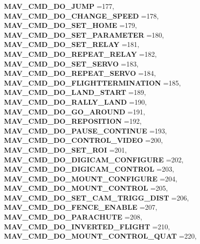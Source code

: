 \begin{DoxyCompactItemize}
\textbf{ M\+A\+V\+\_\+\+C\+M\+D\+\_\+\+D\+O\+\_\+\+J\+U\+MP} =177, 
\textbf{ M\+A\+V\+\_\+\+C\+M\+D\+\_\+\+D\+O\+\_\+\+C\+H\+A\+N\+G\+E\+\_\+\+S\+P\+E\+ED} =178, 
\newline
\textbf{ M\+A\+V\+\_\+\+C\+M\+D\+\_\+\+D\+O\+\_\+\+S\+E\+T\+\_\+\+H\+O\+ME} =179, 
\textbf{ M\+A\+V\+\_\+\+C\+M\+D\+\_\+\+D\+O\+\_\+\+S\+E\+T\+\_\+\+P\+A\+R\+A\+M\+E\+T\+ER} =180, 
\textbf{ M\+A\+V\+\_\+\+C\+M\+D\+\_\+\+D\+O\+\_\+\+S\+E\+T\+\_\+\+R\+E\+L\+AY} =181, 
\textbf{ M\+A\+V\+\_\+\+C\+M\+D\+\_\+\+D\+O\+\_\+\+R\+E\+P\+E\+A\+T\+\_\+\+R\+E\+L\+AY} =182, 
\newline
\textbf{ M\+A\+V\+\_\+\+C\+M\+D\+\_\+\+D\+O\+\_\+\+S\+E\+T\+\_\+\+S\+E\+R\+VO} =183, 
\textbf{ M\+A\+V\+\_\+\+C\+M\+D\+\_\+\+D\+O\+\_\+\+R\+E\+P\+E\+A\+T\+\_\+\+S\+E\+R\+VO} =184, 
\textbf{ M\+A\+V\+\_\+\+C\+M\+D\+\_\+\+D\+O\+\_\+\+F\+L\+I\+G\+H\+T\+T\+E\+R\+M\+I\+N\+A\+T\+I\+ON} =185, 
\textbf{ M\+A\+V\+\_\+\+C\+M\+D\+\_\+\+D\+O\+\_\+\+L\+A\+N\+D\+\_\+\+S\+T\+A\+RT} =189, 
\newline
\textbf{ M\+A\+V\+\_\+\+C\+M\+D\+\_\+\+D\+O\+\_\+\+R\+A\+L\+L\+Y\+\_\+\+L\+A\+ND} =190, 
\textbf{ M\+A\+V\+\_\+\+C\+M\+D\+\_\+\+D\+O\+\_\+\+G\+O\+\_\+\+A\+R\+O\+U\+ND} =191, 
\textbf{ M\+A\+V\+\_\+\+C\+M\+D\+\_\+\+D\+O\+\_\+\+R\+E\+P\+O\+S\+I\+T\+I\+ON} =192, 
\textbf{ M\+A\+V\+\_\+\+C\+M\+D\+\_\+\+D\+O\+\_\+\+P\+A\+U\+S\+E\+\_\+\+C\+O\+N\+T\+I\+N\+UE} =193, 
\newline
\textbf{ M\+A\+V\+\_\+\+C\+M\+D\+\_\+\+D\+O\+\_\+\+C\+O\+N\+T\+R\+O\+L\+\_\+\+V\+I\+D\+EO} =200, 
\textbf{ M\+A\+V\+\_\+\+C\+M\+D\+\_\+\+D\+O\+\_\+\+S\+E\+T\+\_\+\+R\+OI} =201, 
\textbf{ M\+A\+V\+\_\+\+C\+M\+D\+\_\+\+D\+O\+\_\+\+D\+I\+G\+I\+C\+A\+M\+\_\+\+C\+O\+N\+F\+I\+G\+U\+RE} =202, 
\textbf{ M\+A\+V\+\_\+\+C\+M\+D\+\_\+\+D\+O\+\_\+\+D\+I\+G\+I\+C\+A\+M\+\_\+\+C\+O\+N\+T\+R\+OL} =203, 
\newline
\textbf{ M\+A\+V\+\_\+\+C\+M\+D\+\_\+\+D\+O\+\_\+\+M\+O\+U\+N\+T\+\_\+\+C\+O\+N\+F\+I\+G\+U\+RE} =204, 
\textbf{ M\+A\+V\+\_\+\+C\+M\+D\+\_\+\+D\+O\+\_\+\+M\+O\+U\+N\+T\+\_\+\+C\+O\+N\+T\+R\+OL} =205, 
\textbf{ M\+A\+V\+\_\+\+C\+M\+D\+\_\+\+D\+O\+\_\+\+S\+E\+T\+\_\+\+C\+A\+M\+\_\+\+T\+R\+I\+G\+G\+\_\+\+D\+I\+ST} =206, 
\textbf{ M\+A\+V\+\_\+\+C\+M\+D\+\_\+\+D\+O\+\_\+\+F\+E\+N\+C\+E\+\_\+\+E\+N\+A\+B\+LE} =207, 
\newline
\textbf{ M\+A\+V\+\_\+\+C\+M\+D\+\_\+\+D\+O\+\_\+\+P\+A\+R\+A\+C\+H\+U\+TE} =208, 
\textbf{ M\+A\+V\+\_\+\+C\+M\+D\+\_\+\+D\+O\+\_\+\+I\+N\+V\+E\+R\+T\+E\+D\+\_\+\+F\+L\+I\+G\+HT} =210, 
\textbf{ M\+A\+V\+\_\+\+C\+M\+D\+\_\+\+D\+O\+\_\+\+M\+O\+U\+N\+T\+\_\+\+C\+O\+N\+T\+R\+O\+L\+\_\+\+Q\+U\+AT} =220, 

\end{DoxyCompactItemize}
